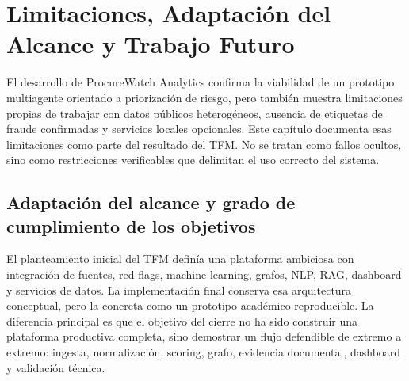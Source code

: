 \documentclass[11pt,a4paper,spanish]{book}
\numberwithin{equation}{chapter}
\numberwithin{figure}{chapter}
\begin{document}


\chapter{Limitaciones, Adaptaci{\'o}n del Alcance y Trabajo Futuro}
\label{cap:limitaciones_trabajo_futuro}

El desarrollo de ProcureWatch Analytics confirma la viabilidad de un prototipo multiagente
orientado a priorizaci{\'o}n de riesgo, pero tambi{\'e}n muestra limitaciones propias de trabajar con
datos p{\'u}blicos heterog{\'e}neos, ausencia de etiquetas de fraude confirmadas y servicios locales
opcionales. Este cap{\'i}tulo documenta esas limitaciones como parte del resultado del TFM. No se
tratan como fallos ocultos, sino como restricciones verificables que delimitan el uso correcto del
sistema.

\section{Adaptaci{\'o}n del alcance y grado de cumplimiento de los objetivos}
\label{sec:adaptacion_alcance}

El planteamiento inicial del TFM defin{\'i}a una plataforma ambiciosa con integraci{\'o}n de fuentes,
red flags, machine learning, grafos, NLP, RAG, dashboard y servicios de datos. La implementaci{\'o}n
final conserva esa arquitectura conceptual, pero la concreta como un prototipo acad{\'e}mico reproducible.
La diferencia principal es que el objetivo del cierre no ha sido construir una plataforma productiva
completa, sino demostrar un flujo defendible de extremo a extremo: ingesta, normalizaci{\'o}n,
scoring, grafo, evidencia documental, dashboard y validaci{\'o}n t{\'e}cnica.
\end{document}
